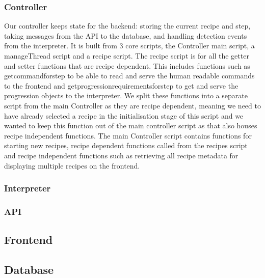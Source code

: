 \documentclass{article}
\begin{document}
    \subsubsection{Controller}
    Our controller keeps state for the backend: storing the current recipe and step, taking messages from the API to the database, and handling detection events from the interpreter. It is built from 3 core scripts, the Controller main script, a manageThread script and a recipe script. 
    The recipe script is for all the getter and setter functions that are recipe dependent. This includes functions such as get\textunderscore command\textunderscore for\textunderscore step to be able to read and serve the human readable commands to the frontend and get\textunderscore progression\textunderscore requirements\textunderscore for\textunderscore step to get and serve the progression objects to the interpreter. We split these functions into a separate script from the main Controller as they are recipe dependent, meaning we need to have already selected a recipe in the initialisation stage of this script and we wanted to keep this function out of the main controller script as that also houses recipe independent functions.
    The main Controller script contains functions for starting new recipes, recipe dependent functions called from the recipes script and recipe independent functions such as retrieving all recipe metadata for displaying multiple recipes on the frontend.
    \subsubsection{Interpreter}
    \subsubsection{API}
    \subsection{Frontend}
 
    \subsection{Database}
\end{document}
